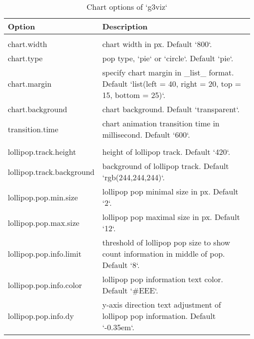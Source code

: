 \documentclass[
]{article}
\begin{document}
\begin{longtabu} to 
\caption{\label{tab:unnamed-chunk-9}Chart options of `g3viz`}\\
\toprule
Option & Description\\
\midrule
\addlinespace[0.3em]
\\
\hspace{1em}chart.width & chart width in px.  Default `800`.\\
\hspace{1em}chart.type & pop type, `pie` or `circle`.  Default `pie`.\\
\hspace{1em}chart.margin & specify chart margin in \_list\_ format.  Default `list(left = 40, right = 20, top = 15, bottom = 25)`.\\
\hspace{1em}chart.background & chart background.  Default `transparent`.\\
\hspace{1em}transition.time & chart animation transition time in millisecond.  Default `600`.\\
\addlinespace[0.3em]
\\
\hspace{1em}lollipop.track.height & height of lollipop track. Default `420`.\\
\hspace{1em}lollipop.track.background & background of lollipop track. Default `rgb(244,244,244)`.\\
\hspace{1em}lollipop.pop.min.size & lollipop pop minimal size in px. Default `2`.\\
\hspace{1em}lollipop.pop.max.size & lollipop pop maximal size in px. Default `12`.\\
\hspace{1em}lollipop.pop.info.limit & threshold of lollipop pop size to show count information in middle of pop. Default `8`.\\
\hspace{1em}lollipop.pop.info.color & lollipop pop information text color. Default `\#EEE`.\\
\hspace{1em}lollipop.pop.info.dy & y-axis direction text adjustment of lollipop pop information. Default `-0.35em`.\\

\end{longtabu}
\end{document}
